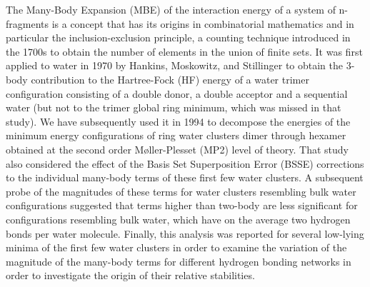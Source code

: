 \documentclass[11pt, proquest]{uwthesis}[2020/02/24]
\begin{document}
\par The Many-Body Expansion (MBE) of the interaction energy of a system of n-fragments is a concept that has its origins in combinatorial mathematics and in particular the inclusion-exclusion principle, a counting technique introduced in the 1700s to obtain the number of elements in the union of finite sets.\autocite{roberts_applied_2009} It was first applied to water in 1970 by Hankins, Moskowitz, and Stillinger\autocite{hankins_water_1970} to obtain the 3-body contribution to the Hartree-Fock (HF) energy of a water trimer configuration consisting of a double donor, a double acceptor and a sequential water (but not to the trimer global ring minimum, which was missed in that study). We have subsequently used it in 1994 to decompose the energies of the minimum energy configurations of ring water clusters dimer through hexamer obtained at the second order Møller-Plesset (MP2) level of theory.\autocite{xantheas_ab_1994} That study also considered the effect of the Basis Set Superposition Error (BSSE) corrections\autocite{boys_calculation_1970, xantheas_importance_1996} to the individual many-body terms of these first few water clusters. A subsequent probe of the magnitudes of these terms for water clusters resembling bulk water configurations suggested that terms higher than two-body are less significant for configurations resembling bulk water, which have on the average two hydrogen bonds per water molecule.\autocite{xantheas_significance_1996} Finally, this analysis was reported for several low-lying minima of the first few water clusters in order to examine the variation of the magnitude of the many-body terms for different hydrogen bonding networks in order to investigate the origin of their relative stabilities.\autocite{xantheas_cooperativity_2000}
\end{document}
